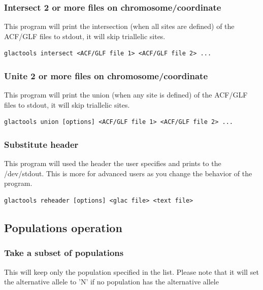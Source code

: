 \documentclass[a4paper]{article}
\begin{document}
\subsubsection{Intersect 2 or more files on chromosome/coordinate}

\noindent This program will print the intersection (when all sites are defined) of the ACF/GLF files to stdout, it will skip triallelic sites.

\begin{lstlisting}
glactools intersect <ACF/GLF file 1> <ACF/GLF file 2> ...
\end{lstlisting}

\subsubsection{Unite 2 or more files on chromosome/coordinate}

\noindent This program will print the union (when any site is defined) of the ACF/GLF files to stdout, it will skip triallelic sites.

\begin{lstlisting}
glactools union [options] <ACF/GLF file 1> <ACF/GLF file 2> ...
\end{lstlisting}


\subsubsection{Substitute header}
\noindent This program will used the header the user specifies and prints to the /dev/stdout. This is more for advanced users as you change the behavior of the program.

\begin{lstlisting}
glactools reheader [options] <glac file> <text file>
\end{lstlisting}



\subsection{Populations operation}

\subsubsection{Take a subset of populations}

\noindent This will keep only the population specified in the list. Please note that it will set the alternative allele to 'N' if no population has the alternative allele
\end{document}
